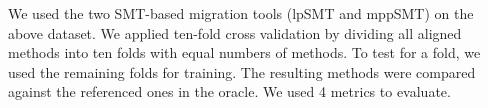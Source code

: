 
We used the two SMT-based migration tools (lpSMT and mppSMT) on the
above dataset. We applied ten-fold cross validation by dividing all
aligned methods into ten folds with equal numbers of methods. To test
for a fold, we used the remaining folds for training. The resulting
methods were compared against the referenced ones in the oracle. We
used 4 metrics to evaluate.

